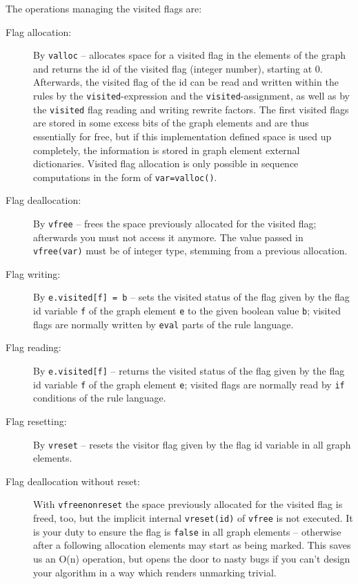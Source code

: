 The operations managing the visited flags are:
\begin{description}
\item[Flag allocation:] By \texttt{valloc}\label{allocvisitflag} -- allocates space for a visited flag in the elements of the graph and returns the id of the visited flag (integer number), starting at 0.
Afterwards, the visited flag of the id can be read and written within the rules by the \texttt{visited}-expression and the \texttt{visited}-assignment,
as well as by the \texttt{visited} flag reading and writing rewrite factors.
The first visited flags are stored in some excess bits of the graph elements and are thus essentially for free,
but if this implementation defined space is used up completely, the information is stored in graph element external dictionaries.
Visited flag allocation is only possible in sequence computations in the form of \texttt{var=valloc()}.
\item[Flag deallocation:] By \texttt{vfree} -- frees the space previously allocated for the visited flag; afterwards you must not access it anymore.
The value passed in \texttt{vfree(var)} must be of integer type, stemming from a previous allocation.
\item[Flag writing:] By \texttt{e.visited[f] = b} -- sets the visited status of the flag given by the flag id variable \texttt{f} of the graph element \texttt{e} to the given boolean value \texttt{b}; visited flags are normally written by \texttt{eval} parts of the rule language.
\item[Flag reading:] By \texttt{e.visited[f]} -- returns the visited status of the flag given by the flag id variable \texttt{f} of the graph element \texttt{e}; visited flags are normally read by \texttt{if} conditions of the rule language.
\item[Flag resetting:] By \texttt{vreset} -- resets the visitor flag given by the flag id variable in all graph elements.
\item[Flag deallocation without reset:] With \texttt{vfreenonreset} the space previously allocated for the visited flag is freed, too, but the implicit internal \texttt{vreset(id)} of \texttt{vfree} is not executed. It is your duty to ensure the flag is \texttt{false} in all graph elements -- otherwise after a following allocation elements may start as being marked. This saves us an O(n) operation, but opens the door to nasty bugs if you can't design your algorithm in a way which renders unmarking trivial.
\end{description}


